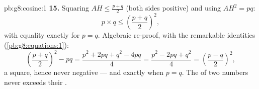 \begin{solution}{pb:g8:cosine:1}
\textbf{15.} Squaring $AH \leq \frac{p+q}{2}$ (both sides
positive) and using $AH^2 = pq$:
\[
p \times q \leq \left(\frac{p+q}{2}\right)^2 ,
\]
with equality exactly for $p = q$. Algebraic re-proof, with the
remarkable identities (\cref{pb:g8:equations:1}):
\[
\left(\frac{p+q}{2}\right)^2 - pq
= \frac{p^2 + 2pq + q^2 - 4pq}{4}
= \frac{p^2 - 2pq + q^2}{4}
= \left(\frac{p-q}{2}\right)^2 ,
\]
a square, hence never negative --- and  exactly when
$p = q$. The  of two numbers never exceeds their
.
\end{solution}
